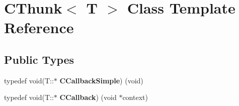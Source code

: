\hypertarget{classCThunk}{}\section{C\+Thunk$<$ T $>$ Class Template Reference}
\label{classCThunk}
\subsection*{Public Types}
\begin{DoxyCompactItemize}
\item 
typedef void(T\+::$\ast$ {\bfseries C\+Callback\+Simple}) (void)\hypertarget{classCThunk_a80117a5ddadaa35142a409d9a7174da4}{}\label{classCThunk_a80117a5ddadaa35142a409d9a7174da4}

\item 
typedef void(T\+::$\ast$ {\bfseries C\+Callback}) (void $\ast$context)\hypertarget{classCThunk_a3b9fb86180e008ef76a22f7ea32a6450}{}\label{classCThunk_a3b9fb86180e008ef76a22f7ea32a6450}

\end{DoxyCompactItemize}
